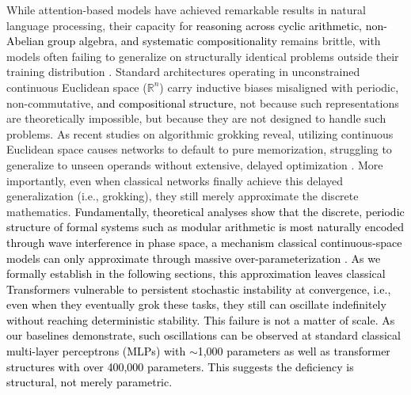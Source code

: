\documentclass[11pt, a4paper]{article}
\begin{document}
\noindent While attention-based models have achieved remarkable results in natural language processing, their capacity for \textcolor{black}{reasoning across cyclic arithmetic, non-Abelian group algebra, and systematic compositionality} remains brittle, with models often failing to generalize on structurally identical problems outside their training distribution \cite{dziri2023faith, trask2018neural, lake2018generalization}. Standard architectures operating in unconstrained continuous Euclidean space ($\mathbb{R}^n$) carry inductive biases misaligned with periodic, non-commutative\textcolor{black}{, and compositional} \textcolor{black}{structure}, not because such representations are theoretically impossible, but because they are not designed to handle such problems. As recent studies on algorithmic grokking reveal, utilizing continuous Euclidean space causes networks to default to pure memorization, struggling to generalize to unseen operands without extensive, delayed optimization \cite{power2022grokking, liu2022towards}. More importantly, even when classical networks finally achieve this delayed generalization (i.e., grokking), they still merely approximate the discrete mathematics. \textcolor{black}{Fundamentally, theoretical analyses show that the discrete, periodic structure of formal systems such as modular arithmetic is most naturally encoded through wave interference in phase space, a mechanism classical continuous-space models can only approximate through massive over-parameterization \cite{gromov2023grokking}.} \textcolor{black}{As we formally establish in the following sections, this approximation leaves classical Transformers vulnerable to persistent stochastic instability at convergence, i.e., even when they eventually grok these tasks, they still can oscillate indefinitely without reaching deterministic stability. This failure is not a matter of scale. As our baselines demonstrate, such oscillations can be observed at standard classical multi-layer perceptrons (MLPs) with ${\sim}$1,000 parameters as well as transformer structures with over 400,000 parameters. This suggests the deficiency is structural, not merely parametric.}
\end{document}
